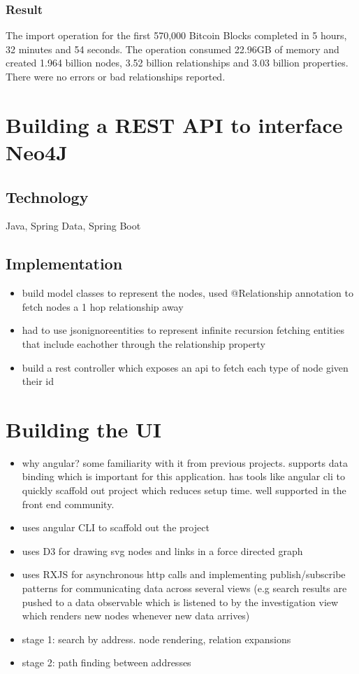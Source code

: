 \subsubsection{Result}
The import operation for the first 570,000 Bitcoin Blocks completed in 5 hours, 32 minutes and 54 seconds. The operation consumed 22.96GB of memory and created 1.964 billion nodes, 3.52 billion relationships and 3.03 billion properties. There were no errors or bad relationships reported. 

\section{Building a REST API to interface Neo4J}

\subsection{Technology}
Java, Spring Data, Spring Boot

\subsection{Implementation}

\begin{itemize}
    \item build model classes to represent the nodes, used @Relationship annotation to fetch nodes a 1 hop relationship away
    \item had to use jsonignoreentities to represent infinite recursion fetching entities that include eachother through the relationship property 
    \item build a rest controller which exposes an api to fetch each type of node given their id
    
\end{itemize}


\section{Building the UI} 
\begin{itemize}
    \item why angular? some familiarity with it from previous projects. supports data binding which is important for this application. has tools like angular cli to quickly scaffold out project which reduces setup time. well supported in the front end community. 
    \item uses angular CLI to scaffold out the project
    \item uses D3 for drawing svg nodes and links in a force directed graph 
    \item uses RXJS for asynchronous http calls and implementing publish/subscribe patterns for communicating data across several views (e.g search results are pushed to a data observable which is listened to by the investigation view which renders new nodes whenever new data arrives) 
    \item stage 1: search by address. node rendering, relation expansions
    \item stage 2: path finding between addresses
    
    
\end{itemize}